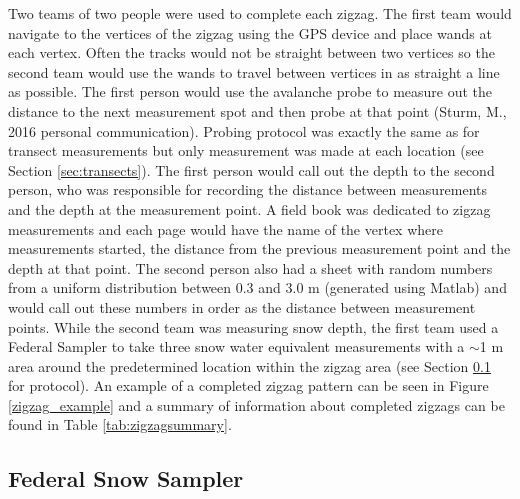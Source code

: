 \documentclass{sfuthesis}
\begin{document}
Two teams of two people were used to complete each zigzag. The first team would navigate to the vertices of the zigzag using the GPS device and place wands at each vertex. Often the tracks would not be straight between two vertices so the second team would use the wands to travel between vertices in as straight a line as possible. The first person would use the avalanche probe to measure out the distance to the next measurement spot and then probe at that point (Sturm, M., 2016 personal communication). Probing protocol was exactly the same as for transect measurements but only measurement was made at each location (see Section \ref{sec:transects}). The first person would call out the depth to the second person, who was responsible for recording the distance between measurements and the depth at the measurement point. A field book was dedicated to zigzag measurements and each page would have the name of the vertex where measurements started, the distance from the previous measurement point and the depth at that point. The second person also had a sheet with random numbers from a uniform distribution between 0.3 and 3.0 m (generated using Matlab) and would call out these numbers in order as the distance between measurement points. While the second team was measuring snow depth, the first team used a Federal Sampler to take three snow water equivalent measurements with a $\sim$1 m area around the predetermined location within the zigzag area (see Section \ref{sec:SWE} for protocol). An example of a completed zigzag pattern can be seen in Figure \ref{zigzag_example} and a summary of information about completed zigzags can be found in Table \ref{tab:zigzagsummary}.  


 \subsection{Federal Snow Sampler}
\label{sec:SWE}
 
\end{document}

